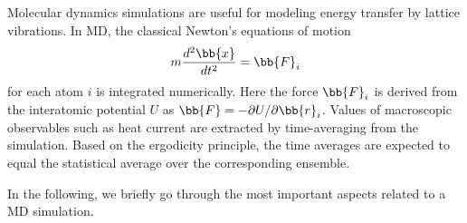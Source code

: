 
Molecular dynamics simulations are useful for modeling energy transfer by lattice vibrations. In MD, the classical Newton's equations of motion 
\begin{equation}
 m \frac{d^2 \bb{x}}{dt^2} = \bb{F}_i 
\end{equation}
for each atom $i$ is integrated numerically. Here the force $\bb{F}_i$ is derived from the interatomic potential $U$ as $\bb{F}=-\partial U/\partial \bb{r}_i$. Values of macroscopic observables such as heat current are extracted by time-averaging from the simulation. Based on the ergodicity principle, the time averages are expected to equal the statistical average over the corresponding ensemble. 


In the following, we briefly go through the most important aspects related to a MD simulation.


